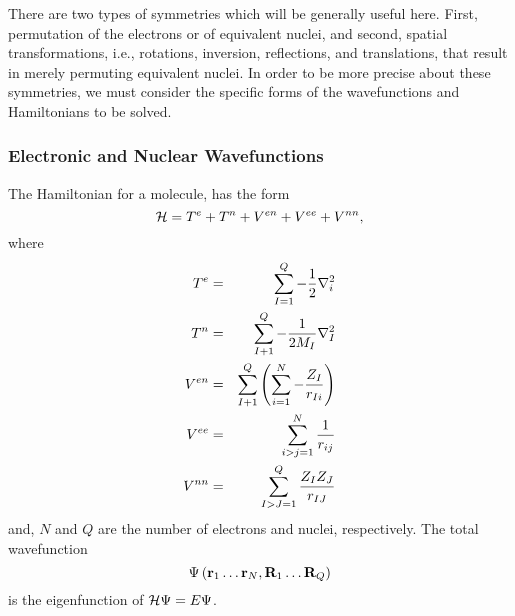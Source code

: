 There are two types of symmetries which will be generally useful 
here.  First, permutation of the electrons or of equivalent nuclei, 
and second, spatial transformations, i.e., rotations, inversion, 
reflections, and translations, that result in merely permuting 
equivalent nuclei.  In order to be more precise about these 
symmetries, we must consider the specific forms of the wavefunctions 
and Hamiltonians to be solved.

\subsubsection{Electronic and Nuclear Wavefunctions}

The Hamiltonian for a molecule, has the form
\begin{equation}
{\cal H} = T^e + T^n + V^{en} + V^{ee} + V^{nn},
\label{chap6app-eqno1}
\end{equation}
where
\begin{eqnarray}
T^e &=& \sum^{Q}_{I=1} - {1 \over 2} \nabla^2_i\cr
T^n &=& \sum^{Q}_{I+1} - {1 \over 2M_I} \nabla^2_I\cr
V^{en} &=& \sum^{Q}_{I+1} \left( \sum^{N}_{i=1} - {Z_I \over r_{Ii}} 
\right)\cr
V^{ee} &=& \sum^{N}_{i>j=1} {1 \over r_{ij}}\cr
V^{nn} &=& \sum^{Q}_{I>J=1} {Z_IZ_J \over r_{IJ}}
\end{eqnarray}
and, $N$ and $Q$ are the number of electrons and nuclei, 
respectively.  The total wavefunction
\begin{equation}
\Psi \left( {\bf r}_1 \dots {\bf r}_N , {\bf R}_1 \dots {\bf R}_Q 
\right)
\end{equation}
is the eigenfunction of ${\cal H} \Psi = E \Psi$.

